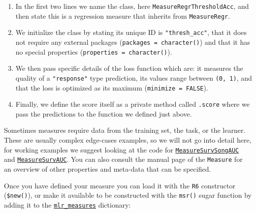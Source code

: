 \begin{enumerate}
\def\labelenumi{\arabic{enumi}.}
\tightlist
\item
  In the first two lines we name the class, here
  \texttt{MeasureRegrThresholdAcc}, and then state this is a regression
  measure that inherits from \texttt{MeasureRegr}.
\item
  We initialize the class by stating its unique ID is
  \texttt{"thresh\_acc"}, that it does not require any external packages
  (\texttt{packages\ =\ character()}) and that it has no special
  properties (\texttt{properties\ =\ character()}).
\item
  We then pass specific details of the loss function which are: it
  measures the quality of a \texttt{"response"} type prediction, its
  values range between \texttt{(0,\ 1)}, and that the loss is optimized
  as its maximum (\texttt{minimize\ =\ FALSE}).
\item
  Finally, we define the score itself as a private method called
  \texttt{.score} where we pass the predictions to the function we
  defined just above.
\end{enumerate}

Sometimes measures require data from the training set, the task, or the
learner. These are usually complex edge-cases examples, so we will not
go into detail here, for working examples we suggest looking at the code
for
\href{https://mlr3proba.mlr-org.com/reference/MeasureSurvSongAUC.html}{\texttt{MeasureSurvSongAUC}}
and
\href{https://mlr3proba.mlr-org.com/reference/MeasureSurvAUC.html}{\texttt{MeasureSurvAUC}}.
You can also consult the manual page of the \texttt{Measure} for an
overview of other properties and meta-data that can be specified.

Once you have defined your measure you can load it with the \texttt{R6}
constructor (\texttt{\$new()}), or make it available to be constructed
with the \texttt{msr()} sugar function by adding it to the
\href{https://mlr3.mlr-org.com/reference/mlr_measures.html}{\texttt{mlr\_measures}}
dictionary:

\begin{Shaded}
\begin{Highlighting}[]
\OtherTok{=} \NormalTok{(}\NormalTok{)}
\OtherTok{=} 
\OtherTok{=} \NormalTok{(}\NormalTok{)}\SpecialCharTok{$}\SpecialCharTok{$}
\OtherTok{=}\SpecialCharTok{$}\SpecialCharTok{$}
\SpecialCharTok{$}\SpecialCharTok{$}\NormalTok{())}
\end{Highlighting}
\end{Shaded}

